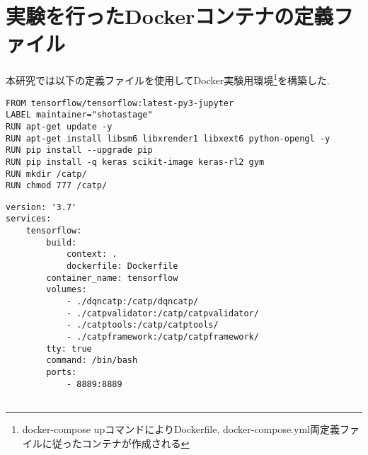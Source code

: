     

\section{実験を行ったDockerコンテナの定義ファイル}

本研究では以下の定義ファイルを使用してDocker実験用環境\footnote{docker-compose upコマンドによりDockerfile, docker-compose.yml両定義ファイルに従ったコンテナが作成される}を構築した.

\begin{lstlisting}[caption = Dockerfileの定義, label = program1]
FROM tensorflow/tensorflow:latest-py3-jupyter
LABEL maintainer="shotastage"
RUN apt-get update -y
RUN apt-get install libsm6 libxrender1 libxext6 python-opengl -y
RUN pip install --upgrade pip
RUN pip install -q keras scikit-image keras-rl2 gym
RUN mkdir /catp/
RUN chmod 777 /catp/
\end{lstlisting}



\begin{lstlisting}[caption = docker-compose.ymlの定義, label = program1]
version: '3.7'
services:
    tensorflow:
        build:
            context: .
            dockerfile: Dockerfile
        container_name: tensorflow
        volumes:
            - ./dqncatp:/catp/dqncatp/
            - ./catpvalidator:/catp/catpvalidator/
            - ./catptools:/catp/catptools/
            - ./catpframework:/catp/catpframework/
        tty: true
        command: /bin/bash
        ports:
            - 8889:8889
    
\end{lstlisting}
    

